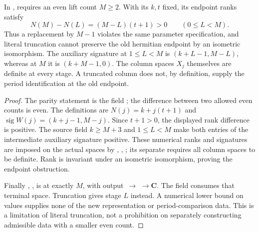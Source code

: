 \begin{proposition}\label{DP27}
In ,  requires an even lift count $M\ge2$. With its $k,t$ fixed, its endpoint ranks satisfy
\[
 N(M)-N(L)=(M-L)(t+1)>0\qquad(0\le L<M).
\]
Thus a replacement by $M-1$ violates the same parameter specification, and literal truncation cannot preserve the old hermitian endpoint by an isometric isomorphism. The auxiliary signature at $1\le L<M$ is $(k+L-1,M-L)$, whereas at $M$ it is $(k+M-1,0)$. The column spaces $X_j$ themselves are definite at every stage. A truncated column does not, by definition, supply the period identification at the old endpoint.
\end{proposition}
\begin{proof}
The parity statement is the field ; the difference between two allowed even counts is even. The definitions are $N(j)=k+j(t+1)$ and $\operatorname{sig}W(j)=(k+j-1,M-j)$. Since $t+1>0$, the displayed rank difference is positive. The source field $k\ge M+3$ and $1\le L<M$ make both entries of the intermediate auxiliary signature positive. These numerical ranks and signatures are imposed on the actual spaces by , , ; its separate  requires all column spaces to be definite. Rank is invariant under an isometric isomorphism, proving the endpoint obstruction.

Finally , , is  at exactly $M$, with output \,$\to$\,\,$\to\mathbf C$. The field  consumes that terminal space. Truncation gives stage $L$ instead. A numerical lower bound on values supplies none of the new representation or period-comparison data. This is a limitation of literal truncation, not a prohibition on separately constructing admissible data with a smaller even count.
\end{proof}
